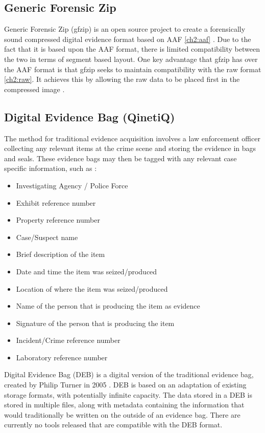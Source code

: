 \documentclass[runningheads,a4paper]{llncs}
\begin{document}
\subsection{Generic Forensic Zip}
\label{ch2:gfzip}

Generic Forensic Zip (gfzip) is an open source project to create a forensically sound compressed digital evidence format based on AAF \ref{ch2:aaf} \cite{gfzip}. Due to the fact that it is based upon the AAF format, there is limited compatibility between the two in terms of segment based layout. One key advantage that gfzip has over the AAF format is that gfzip seeks to maintain compatibility with the raw format \ref{ch2:raw}. It achieves this by allowing the raw data to be placed first in the compressed image \cite{containers}.

\subsection{Digital Evidence Bag (QinetiQ)}
\label{ch2:debq}

The method for traditional evidence acquisition involves a law enforcement officer collecting any relevant items at the crime scene and storing the evidence in bags and seals. These evidence bags may then be tagged with any relevant case specific information, such as \cite{debq}:
\begin{itemize}
\item Investigating Agency / Police Force
\item Exhibit reference number
\item Property reference number
\item Case/Suspect name
\item Brief description of the item
\item Date and time the item was seized/produced
\item Location of where the item was seized/produced
\item Name of the person that is producing the item as evidence
\item Signature of the person that is producing the item
\item Incident/Crime reference number
\item Laboratory reference number
\end{itemize}

Digital Evidence Bag (DEB) is a digital version of the traditional evidence bag, created by Philip Turner in 2005 \cite{debq}. DEB is based on an adaptation of existing storage formats, with potentially infinite capacity. The data stored in a DEB is stored in multiple files, along with metadata containing the information that would traditionally be written on the outside of an evidence bag. There are currently no tools released that are compatible with the DEB format.
\end{document}

